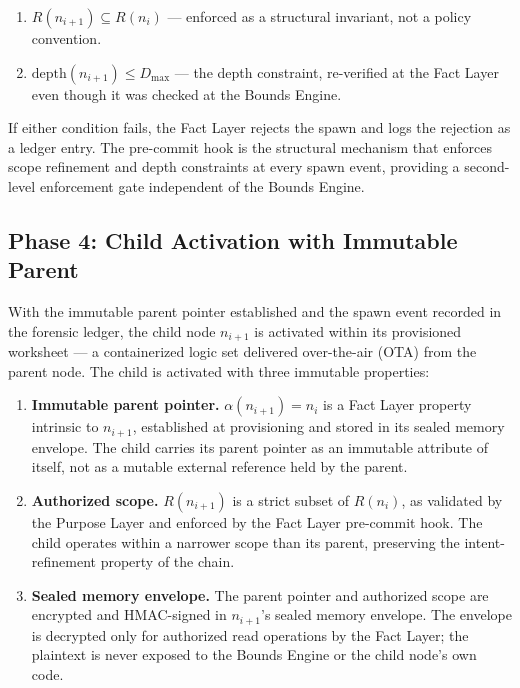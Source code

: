 \begin{enumerate}
    \item[(FC1)] $R(n_{i+1}) \subseteq R(n_i)$ --- enforced as a structural invariant, not a policy convention.
    \item[(FC2)] $\text{depth}(n_{i+1}) \leq D_{\max}$ --- the depth constraint, re-verified at the Fact Layer even though it was checked at the Bounds Engine.
\end{enumerate}

If either condition fails, the Fact Layer rejects the spawn and logs the rejection as a ledger entry. The pre-commit hook is the structural mechanism that enforces scope refinement and depth constraints at every spawn event, providing a second-level enforcement gate independent of the Bounds Engine.

\subsection{Phase 4: Child Activation with Immutable Parent}
\label{sec:rs-phase4-child-activation}

With the immutable parent pointer established and the spawn event recorded in the forensic ledger, the child node $n_{i+1}$ is activated within its provisioned worksheet --- a containerized logic set delivered over-the-air (OTA) from the parent node. The child is activated with three immutable properties:

\begin{enumerate}
    \item \textbf{Immutable parent pointer.} $\alpha(n_{i+1}) = n_i$ is a Fact Layer property intrinsic to $n_{i+1}$, established at provisioning and stored in its sealed memory envelope. The child carries its parent pointer as an immutable attribute of itself, not as a mutable external reference held by the parent.

    \item \textbf{Authorized scope.} $R(n_{i+1})$ is a strict subset of $R(n_i)$, as validated by the Purpose Layer and enforced by the Fact Layer pre-commit hook. The child operates within a narrower scope than its parent, preserving the intent-refinement property of the chain.

    \item \textbf{Sealed memory envelope.} The parent pointer and authorized scope are encrypted and HMAC-signed in $n_{i+1}$'s sealed memory envelope. The envelope is decrypted only for authorized read operations by the Fact Layer; the plaintext is never exposed to the Bounds Engine or the child node's own code.
\end{enumerate}

